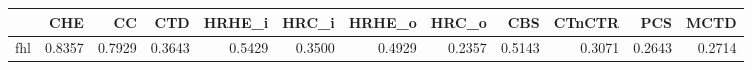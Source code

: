 \begin{tabular}{lrrrrrrrrrrr}
\toprule
 & CHE & CC & CTD & HRHE_i & HRC_i & HRHE_o & HRC_o & CBS & CTnCTR & PCS & MCTD \\
\midrule
fhl & 0.8357 & 0.7929 & 0.3643 & 0.5429 & 0.3500 & 0.4929 & 0.2357 & 0.5143 & 0.3071 & 0.2643 & 0.2714 \\
\bottomrule
\end{tabular}
